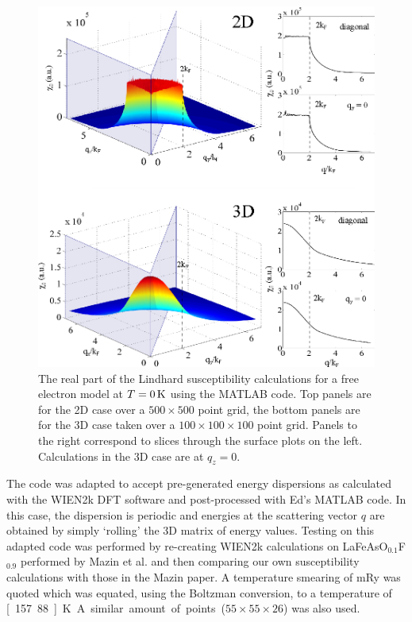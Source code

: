 \begin{figure}[htbp]
    \begin{center}
        \includegraphics[scale=0.9]{Chapter-ExperimentalTechnique/Figures/Susceptibility/FreeElectron/FreeElectron}
        \caption{The real part of the Lindhard susceptibility calculations for a free electron model at $T=\unit[0]{K}$ using the MATLAB  code. Top panels are for the 2D case over a $500\times500$ point grid, the bottom panels are for the 3D case taken over a $100\times100\times100$ point grid. Panels to the right correspond to slices through the surface plots on the left. Calculations in the 3D case are at $q_z=0$.}
        \label{Fig:Exp:FreeElectronSusceptibility}
    \end{center}
\end{figure}


The code was adapted to accept pre-generated energy dispersions as calculated with the WIEN2k DFT software and post-processed with Ed's MATLAB code. In this case, the dispersion is periodic and energies at the scattering vector $q$ are obtained by simply `rolling' the 3D matrix of energy values. Testing on this adapted code was performed by re-creating WIEN2k calculations on LaFeAsO$_{0.1}$F$_{0.9}$ performed by Mazin et al.\cite{Mazin2008} and then comparing our own susceptibility calculations with those in the Mazin paper. A temperature smearing of \unit[1]{mRy} was quoted which was equated, using the Boltzman conversion, to a temperature of \unit[157.88]{K}. A similar amount of points ($55\times55\times26$) was also used.

